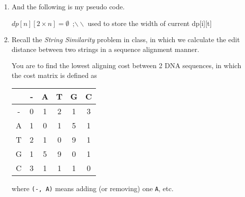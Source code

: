 \documentclass[12pt,a4paper]{article}
\makeatletter
\newtheorem*{solution}{Solution}
\theoremstyle{definition}
\renewenvironment{solution}[1][Solution] {\par\pushQED{\qed}\normalfont\topsep6\p@\@plus6\p@\relax\trivlist\item[\hskip\labelsep\bfseries#1\@addpunct{.}]\ignorespaces}{\popQED\endtrivlist\@endpefalse} \makeatother
\makeatother
\begin{document}
\begin{enumerate}
\begin{solution}
       And the following is my pseudo code.

       \begin{algorithm}[H]
        \BlankLine
        \caption{$minthickness()$}
        $dp[n][2\times n]=\emptyset$\ ;$\backslash \backslash$ used to store the width of current dp[i][t]\\

       \end{algorithm}
    \end{solution}

    \item
    Recall the \emph{String Similarity} problem in class, in which we calculate the edit distance between two strings in a sequence alignment manner.

    You are to find the lowest aligning cost between 2 DNA sequences, in which the cost matrix is defined as

    \begin{center}
        \begin{tabular}{|c||c|c|c|c|c|}
        \hline
          & - & A & T & G & C \\
        \hline
        - & 0 & 1 & 2 & 1 & 3 \\
        A & 1 & 0 & 1 & 5 & 1 \\
        T & 2 & 1 & 0 & 9 & 1 \\
        G & 1 & 5 & 9 & 0 & 1 \\
        C & 3 & 1 & 1 & 1 & 0 \\
        \hline
        \end{tabular}
    \end{center}

    where \texttt{(-, A)} means adding (or removing) one \texttt{A}, etc.


\end{enumerate}
\end{document}
